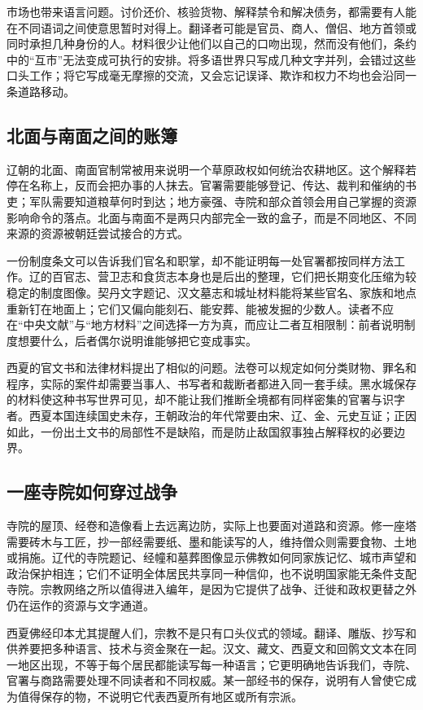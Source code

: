 市场也带来语言问题。讨价还价、核验货物、解释禁令和解决债务，都需要有人能在不同语词之间使意思暂时对得上。翻译者可能是官员、商人、僧侣、地方首领或同时承担几种身份的人。材料很少让他们以自己的口吻出现，然而没有他们，条约中的“互市”无法变成可执行的安排。将多语世界只写成几种文字并列，会错过这些口头工作；将它写成毫无摩擦的交流，又会忘记误译、欺诈和权力不均也会沿同一条道路移动。

\subsection{北面与南面之间的账簿}

辽朝的北面、南面官制常被用来说明一个草原政权如何统治农耕地区。这个解释若停在名称上，反而会把办事的人抹去。官署需要能够登记、传达、裁判和催纳的书吏；军队需要知道粮草何时到达；地方豪强、寺院和部众首领会用自己掌握的资源影响命令的落点。北面与南面不是两只内部完全一致的盒子，而是不同地区、不同来源的资源被朝廷尝试接合的方式。

一份制度条文可以告诉我们官名和职掌，却不能证明每一处官署都按同样方法工作。辽的百官志、营卫志和食货志本身也是后出的整理，它们把长期变化压缩为较稳定的制度图像。契丹文字题记、汉文墓志和城址材料能将某些官名、家族和地点重新钉在地面上；它们又偏向能刻石、能安葬、能被发掘的少数人。读者不应在“中央文献”与“地方材料”之间选择一方为真，而应让二者互相限制：前者说明制度想要什么，后者偶尔说明谁能够把它变成事实。

西夏的官文书和法律材料提出了相似的问题。法卷可以规定如何分类财物、罪名和程序，实际的案件却需要当事人、书写者和裁断者都进入同一套手续。黑水城保存的材料使这种书写世界可见，却不能让我们推断全境都有同样密集的官署与识字者。西夏本国连续国史未存，王朝政治的年代常要由宋、辽、金、元史互证；正因如此，一份出土文书的局部性不是缺陷，而是防止敌国叙事独占解释权的必要边界。

\subsection{一座寺院如何穿过战争}

寺院的屋顶、经卷和造像看上去远离边防，实际上也要面对道路和资源。修一座塔需要砖木与工匠，抄一部经需要纸、墨和能读写的人，维持僧众则需要食物、土地或捐施。辽代的寺院题记、经幢和墓葬图像显示佛教如何同家族记忆、城市声望和政治保护相连；它们不证明全体居民共享同一种信仰，也不说明国家能无条件支配寺院。宗教网络之所以值得进入编年，是因为它提供了战争、迁徙和政权更替之外仍在运作的资源与文字通道。

西夏佛经印本尤其提醒人们，宗教不是只有口头仪式的领域。翻译、雕版、抄写和供养要把多种语言、技术与资金聚在一起。汉文、藏文、西夏文和回鹘文文本在同一地区出现，不等于每个居民都能读写每一种语言；它更明确地告诉我们，寺院、官署与商路需要处理不同读者和不同权威。某一部经书的保存，说明有人曾使它成为值得保存的物，不说明它代表西夏所有地区或所有宗派。

